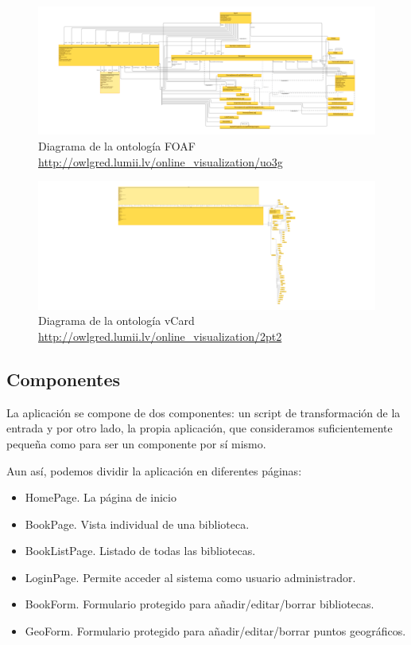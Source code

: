 \documentclass[12pt]{report} %
\begin{document}
\begin{figure}
    \centering
    \includegraphics[width=\textwidth]{foaf.png}
    \caption{Diagrama de la ontología FOAF \\ \url{http://owlgred.lumii.lv/online_visualization/uo3g}}
    \label{fig:foaf}
\end{figure}

\begin{figure}
    \centering
    \includegraphics[width=\textwidth]{vcard.png}
    \caption{Diagrama de la ontología vCard \\ \url{http://owlgred.lumii.lv/online_visualization/2pt2}}
    \label{fig:vcard}
\end{figure}

\subsection{Componentes}

La aplicación se compone de dos componentes: un script de transformación de la entrada y por otro lado, la propia aplicación, que consideramos suficientemente pequeña como para ser un componente por sí mismo.

Aun así, podemos dividir la aplicación en diferentes páginas:
\begin{itemize}
    \item HomePage. La página de inicio
    \item BookPage. Vista individual de una biblioteca.
    \item BookListPage. Listado de todas las bibliotecas.
    \item LoginPage. Permite acceder al sistema como usuario administrador.
    \item BookForm. Formulario protegido para añadir/editar/borrar bibliotecas.
    \item GeoForm. Formulario protegido para añadir/editar/borrar puntos geográficos.
\end{itemize}
\end{document}
